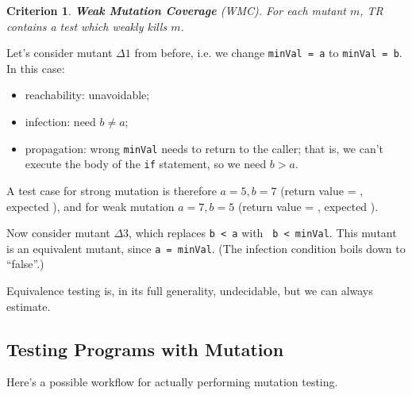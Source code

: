\documentclass[11pt]{article}
\newtheorem{crit}{Criterion}
\begin{document}

\begin{crit}
{\bf Weak Mutation Coverage} (WMC). For each mutant $m$, TR contains
a test which weakly kills $m$.
\end{crit}

Let's consider mutant $\Delta 1$ from before, i.e. we change
{\tt minVal = a} to {\tt minVal = b}. In this case:
\begin{itemize}
\item reachability: unavoidable;
\item infection: need $b \neq a$;
\item propagation: wrong {\tt minVal} needs to return to the caller;
that is, we can't execute the body of the {\tt if} statement, so we
need $b > a$.
\end{itemize}
A test case for strong mutation is therefore $a = 5, b = 7$ (return
value = \textvisiblespace, expected \textvisiblespace), and for
weak mutation $a = 7, b = 5$ (return value = \textvisiblespace, expected
\textvisiblespace).

Now consider mutant $\Delta 3$, which replaces {\tt b < a} with {\tt 
b < minVal}. This mutant is an equivalent mutant, since {\tt a = minVal}.
(The infection condition boils down to ``false''.)

Equivalence testing is, in its full generality, undecidable, but we can always
estimate.

\subsection*{Testing Programs with Mutation}
Here's a possible workflow for actually performing mutation testing.
\end{document}
